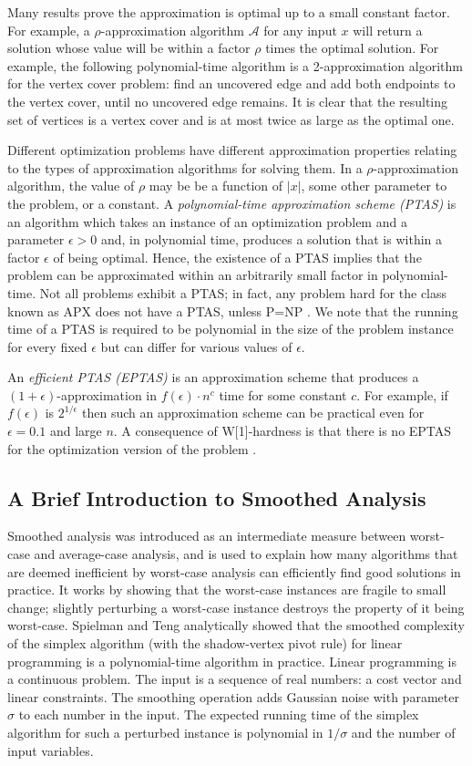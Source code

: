 Many results prove the approximation is optimal up to a small constant factor. For example, a $\rho$-approximation algorithm $\mathcal{A}$  for any input $x$ will return a solution whose value will be within a factor $\rho$ times the optimal solution.  For example, the following polynomial-time algorithm is a 2-approximation algorithm for the vertex cover problem: find an uncovered edge and add both endpoints to the vertex cover, until no uncovered edge remains. It is clear that the resulting set of vertices is a vertex cover and is at most twice as large as the optimal one. 

Different optimization problems have different approximation properties relating to the types of approximation algorithms for solving them.  In a $\rho$-approximation algorithm, the value of $\rho$ may be be a function of $|x|$, some other parameter to the problem, or a constant.  A {\em polynomial-time approximation scheme (PTAS)} is an algorithm which takes an instance of an optimization problem and a parameter $\epsilon > 0$ and, in polynomial time, produces a solution that is within a factor $\epsilon$ of being optimal.  Hence, the existence of a PTAS implies that the problem can be approximated within an arbitrarily small factor in polynomial-time.  Not all problems exhibit a PTAS; in fact, any problem hard for the class known as APX does not have a PTAS, unless P=NP \cite{vazirani}. We note that the running time of a PTAS is required to be polynomial in the size of the problem instance for every fixed $\epsilon$ but can differ for various values of $\epsilon$. 

An {\em efficient PTAS (EPTAS)} is an approximation scheme that produces a $(1 + \epsilon)$-approximation in $f(\epsilon) \cdot n^c$ time for some constant $c$.  For example, if $f(\epsilon)$ is $2^{1/\epsilon}$ then such an approximation scheme can be practical even for $\epsilon = 0.1$ and large $n$.  A consequence of W[1]-hardness is that there is no EPTAS for the optimization version of the problem \cite{ct}.

\subsection{A Brief Introduction to Smoothed Analysis}


Smoothed analysis was introduced as an intermediate measure between worst-case and average-case analysis, and is used to explain how many algorithms that are deemed inefficient by worst-case analysis can efficiently find good solutions in practice.  It works by showing that the worst-case instances are fragile to small change; slightly perturbing a worst-case instance destroys the property of it being worst-case.  Spielman and Teng \cite{ST01} analytically showed that the smoothed complexity of the simplex algorithm (with the shadow-vertex pivot rule) for linear programming is a polynomial-time algorithm in practice.  Linear programming is a continuous problem.  The input is a sequence of real numbers: a cost vector and linear constraints.  The smoothing operation adds Gaussian noise with parameter $\sigma$ to each number in the input. The expected running time of the simplex algorithm for such a perturbed instance is polynomial in $1/\sigma$ and the number of input variables. 

